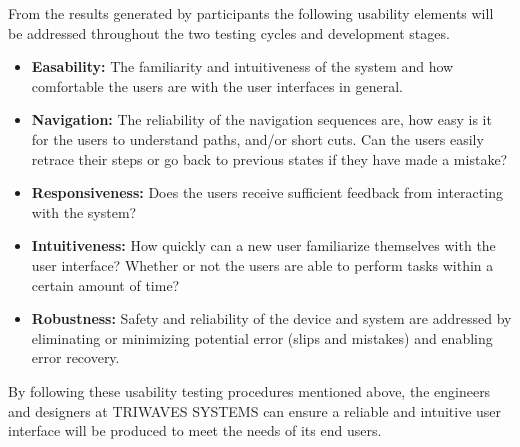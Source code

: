 \bigskip
From the results generated by participants the following usability elements will be addressed throughout the two testing cycles and development stages. 

\medskip
\begin{itemize}
\setlength\itemsep{0.1mm}
	\item \textbf{Easability:} The familiarity and intuitiveness of the system and how comfortable the users are with the user interfaces in general. 
	\item \textbf{Navigation:} The reliability of the navigation sequences are, how easy is it for the users to understand paths, and/or short cuts. Can the users easily retrace their steps or go back to previous states if they have made a mistake?
	\item \textbf{Responsiveness:} Does the users receive sufficient feedback from interacting with the system? 
	\item \textbf{Intuitiveness:} How quickly can a new user familiarize themselves with the user interface? Whether or not the users are able to perform tasks within a certain amount of time?
	\item \textbf{Robustness:} Safety and reliability of the device and system are addressed by eliminating or minimizing potential error (slips and mistakes) and enabling error recovery.
\end{itemize}

\medskip
By following these usability testing procedures mentioned above, the engineers and designers at TRIWAVES SYSTEMS can ensure a reliable and intuitive user interface will be produced to meet the needs of its end users. 